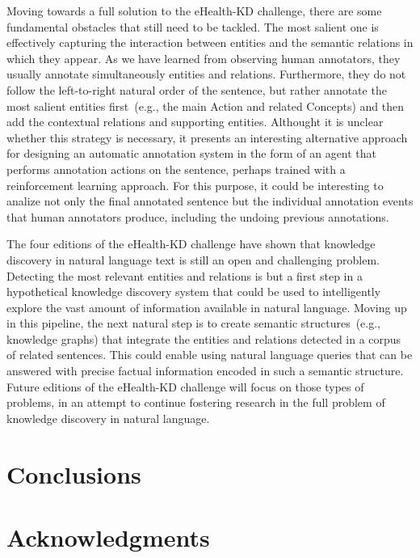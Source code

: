 \documentclass[a4paper,11pt,twocolumn,twoside]{article}
\begin{document}
Moving towards a full solution to the eHealth-KD challenge, there are some fundamental obstacles that still need to be tackled.
The most salient one is effectively capturing the interaction between entities and the semantic relations in which they appear.
As we have learned from observing human annotators, they usually annotate simultaneously entities and relations.
Furthermore, they do not follow the left-to-right natural order of the sentence, but rather annotate the most salient entities first~(e.g., the main Action and related Concepts) and then add the contextual relations and supporting entities.
Althought it is unclear whether this strategy is necessary, it presents an interesting alternative approach for designing an automatic annotation system in the form of an agent that performs annotation actions on the sentence, perhaps trained with a reinforcement learning approach.
For this purpose, it could be interesting to analize not only the final annotated sentence but the individual annotation events that human annotators produce, including the undoing previous annotations.

The four editions of the eHealth-KD challenge have shown that knowledge discovery in natural language text is still an open and challenging problem.
Detecting the most relevant entities and relations is but a first step in a hypothetical knowledge discovery system that could be used to intelligently explore the vast amount of information available in natural language.
Moving up in this pipeline, the next natural step is to create semantic structures~(e.g., knowledge graphs) that integrate the entities and relations detected in a corpus of related sentences.
This could enable using natural language queries that can be answered with precise factual information encoded in such a semantic structure.
Future editions of the eHealth-KD challenge will focus on those types of problems, in an attempt to continue fostering research in the full problem of knowledge discovery in natural language.

\section{Conclusions}\label{sec:conclusions}

\section*{Acknowledgments}



\end{document}
